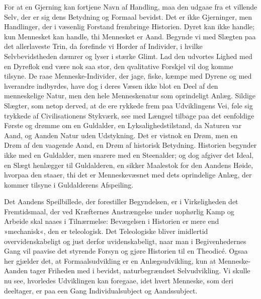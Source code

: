 \documentclass[12pt]{book}
\newcommand{\apage}[1]{\marginnote{\footnotesize\textit{[#1]}}}
\begin{document}
For at en Gjerning kan fortjene Navn af Handling, maa den udgaae fra et
villende Selv, der er sig dens Betydning og Formaal bevidst. Det er ikke
Gjerninger, men Handlinger, der i væsenlig Forstand frembringe Historien.
Dyret kan ikke handle; kun Mennesket kan handle, thi Mennesket er Aand.
Begynde vi med Slægten paa det allerlaveste Trin, da forefinde vi Horder af
Individer, i hvilke Selvbevidstheden dæmrer og lyser i stærke Glimt. Lad den
udvortes Lighed med en Dyreflok end være nok saa stor, den qvalitative
Forskjel vil dog komme tilsyne. De raae Menneske-Individer, der jage, fiske,
kæmpe med Dyrene og med hverandre indbyrdes, have dog i deres Væsen ikke
blot en Deel af den menneskelige Natur, men den hele Menneskenatur som
oprindeligt Anlæg. Sildige Slægter, som netop derved, at de ere rykkede frem
paa Udviklingens Vei, føle sig trykkede af Civilisationens Stykværk, see med
Længsel tilbage paa det eenfoldige Første og drømme om en Guldalder, en
Lyksalighedstilstand, da Naturen var Aand, og Aanden Natur uden Udstykning.
Det er vistnok en Drøm, men en Drøm af den vaagende Aand, en Drøm af
historisk Betydning. Historien begynder ikke med en Guldalder, men snarere
med en Steenalder; og dog afgiver det Ideal, en Slægt henlægger til
Guldalderen, en sikker  \apage{234} Maalestok for den Aandens Høide, hvorpaa den staaer,
thi det er Menneskevæsnet med dets oprindelige Anlæg, der kommer tilsyne i
Guldalderens Afspeiling.

Det Aandens Speilbillede, der forestiller Begyndelsen, er i Virkeligheden
det Fremtidsmaal, der ved Kræfternes Anstrængelse under uophørlig Kamp og
Arbeide skal naaes i Tilnærmelse: Bevægelsen i Historien er mere end
»mechanisk«, den er teleologisk. Det Teleologiske bliver imidlertid
overvidenskabeligt og just derfor uvidenskabeligt, naar man i
Begivenhedernes Gang vil paavise det styrende Forsyn og gjøre Historien til
en Theodicé. Ogsaa her gjælder det, at Formaalsudvikling er en
Anlægsudvikling, kun at Menneske-Aanden tager Friheden med i bevidst,
naturbegrændset Selvudvikling. Vi skulle nu see, hvorledes Udviklingen kan
foregaae, idet hvert Menneske, som deri deeltager, er paa een Gang
Individualsubject og Aandssubject.
\end{document}
